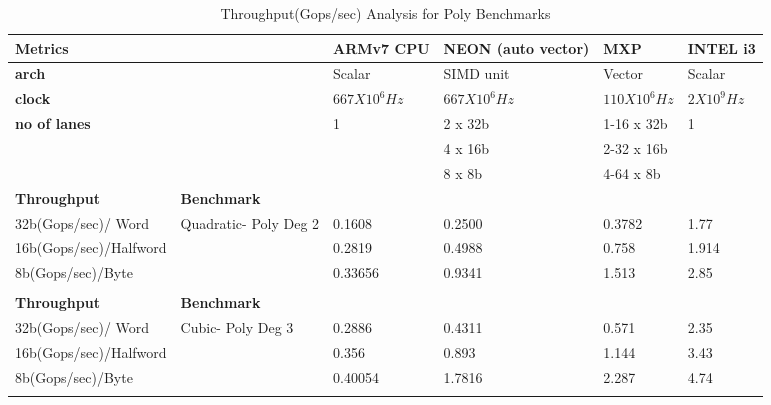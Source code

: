 \begin{table}[htbp]
	\centering
	\begin{adjustbox}{width=1\textwidth}
		\small
		\begin{tabular}{llllll}
			\toprule
			\textbf{Metrics} &   & \textbf{ARMv7 CPU} & \textbf{NEON (auto vector)} & \textbf{MXP} & \textbf{INTEL i3} \\
			\midrule
			\textbf{arch} &   & Scalar & SIMD unit & Vector & Scalar \\
			\textbf{clock} &   & $667 X 10^{6}Hz$ & $667 X 10^{6}Hz$ & $110 X 10^{6}Hz$ & $2 X 10^{9}Hz$ \\
			\textbf{no of lanes} &   & 1 & 2 x 32b & 1-16 x 32b & 1 \\
			&   &   & 4 x 16b & 2-32 x 16b &  \\
			&   &   & 8 x 8b & 4-64 x 8b &  \\
			\midrule
			 \textbf{Throughput} & \textbf{Benchmark} &   &   &   &  \\
			\midrule
			 32b(Gops/sec)/ Word   & Quadratic- Poly Deg 2  & 0.1608  & 0.2500 & 0.3782 & 1.77 \\
			 16b(Gops/sec)/Halfword &   & 0.2819 & 0.4988 & 0.758 & 1.914\\
			 8b(Gops/sec)/Byte &   & 0.33656 & 0.9341 & 1.513 & 2.85 \\
			   &   &   &   &   &  \\
			\midrule
			 \textbf{Throughput} & \textbf{Benchmark} &   &   &   &  \\
			\midrule
			 32b(Gops/sec)/ Word   & Cubic- Poly Deg 3    & 0.2886 & 0.4311 & 0.571 & 2.35 \\
			 16b(Gops/sec)/Halfword &   & 0.356 & 0.893 & 1.144 & 3.43 \\
			 8b(Gops/sec)/Byte &   & 0.40054 & 1.7816 & 2.287 & 4.74 \\
			   &   &   &   &   &  \\
			\bottomrule
		\end{tabular}%
	\end{adjustbox}%
	\caption{Throughput(Gops/sec) Analysis for Poly Benchmarks}
	\label{poly:c}%
\end{table}%
